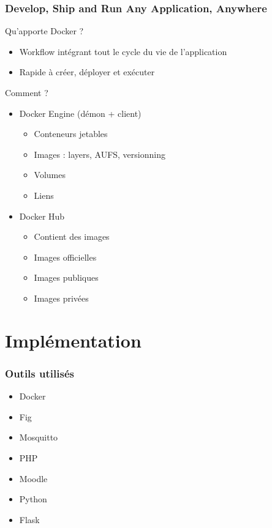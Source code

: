 \documentclass[10pt, compress]{beamer}
\begin{document}
\begin{frame}[fragile]
  \frametitle{Develop, Ship and Run Any Application, Anywhere}
  Qu'apporte Docker ?
  \pause
  \begin{itemize}[<+- | alert@+>]
  \item Workflow intégrant tout le cycle du vie de l'application
  \item Rapide à créer, déployer et exécuter
  \end{itemize}
  \pause
   Comment ?
   \pause
  
\begin{itemize}[<+- | alert@+>]
  \item Docker Engine (démon + client)
    \begin{itemize}[<+- | alert@+>]
      \item Conteneurs jetables
      \item Images : layers, AUFS, versionning
      \item Volumes
      \item Liens
    \end{itemize}
  \item Docker Hub
  \begin{itemize}[<+- | alert@+>]
      \item Contient des images
      \item Images officielles
      \item Images publiques
      \item Images privées
    \end{itemize}

\end{itemize}
\end{frame}

\section{Implémentation}

\begin{frame}[fragile]
  \frametitle{Outils utilisés}

  \begin{itemize}
      \item Docker
      \item Fig
      \item Mosquitto
      \item PHP
      \item Moodle
      \item Python
      \item Flask
    \end{itemize}
  
\end{frame}
\end{document}
